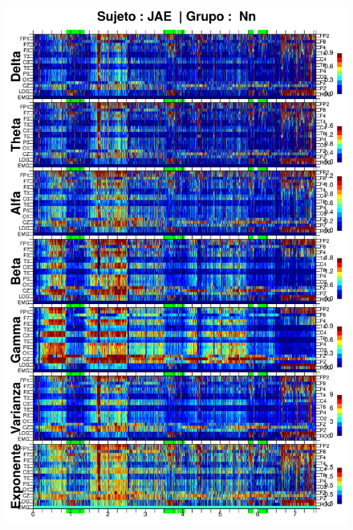 \begin{figure}
\centering
\includegraphics[width=0.9\linewidth]
{./img_resultados/JANASUE_espectral_total.png} 
\end{figure}
